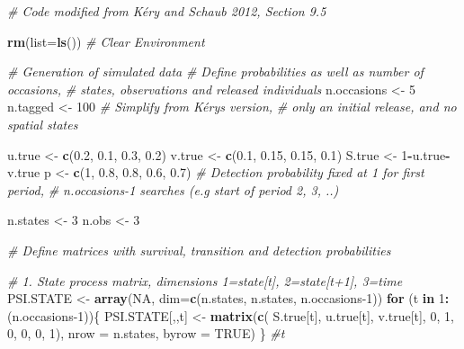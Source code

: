 \documentclass[
]{krantz}
\makeatletter
\newenvironment{Shaded}{\begin{snugshade}}{\end{snugshade}}
\newcommand{\AttributeTok}[1]{\textcolor[rgb]{0.27,0.27,0.27}{#1}}
\newcommand{\CommentTok}[1]{\textcolor[rgb]{0.37,0.37,0.37}{\textit{#1}}}
\newcommand{\ConstantTok}[1]{\textcolor[rgb]{0.37,0.37,0.37}{#1}}
\newcommand{\ControlFlowTok}[1]{\textcolor[rgb]{0.27,0.27,0.27}{\textbf{#1}}}
\newcommand{\DecValTok}[1]{\textcolor[rgb]{0.06,0.06,0.06}{#1}}
\newcommand{\FloatTok}[1]{\textcolor[rgb]{0.06,0.06,0.06}{#1}}
\newcommand{\FunctionTok}[1]{\textcolor[rgb]{0.27,0.27,0.27}{\textbf{#1}}}
\newcommand{\NormalTok}[1]{#1}
\newcommand{\OtherTok}[1]{\textcolor[rgb]{0.37,0.37,0.37}{#1}}
\newcommand{\SpecialCharTok}[1]{\textcolor[rgb]{0.43,0.43,0.43}{\textbf{#1}}}
\newenvironment{kframe}{%
\medskip{}
\setlength{\fboxsep}{.8em}
 \def\at@end@of@kframe{}%
 \ifinner\ifhmode%
  \def\at@end@of@kframe{\end{minipage}}%
  \begin{minipage}{\columnwidth}%
 \fi\fi%
 \def\FrameCommand##1{\hskip\@totalleftmargin \hskip-\fboxsep
 \colorbox{shadecolor}{##1}\hskip-\fboxsep
     \hskip-\linewidth \hskip-\@totalleftmargin \hskip\columnwidth}%
 \MakeFramed {\advance\hsize-\width
   \@totalleftmargin\z@ \linewidth\hsize
   \@setminipage}}%
 {\par\unskip\endMakeFramed%
 \at@end@of@kframe}
\renewenvironment{Shaded}{\begin{kframe}}{\end{kframe}}
\makeatother
\begin{document}
\begin{Shaded}
\begin{Highlighting}[]
\CommentTok{\# Code modified from Kéry and Schaub 2012, Section 9.5}

\FunctionTok{rm}\NormalTok{(}\AttributeTok{list=}\FunctionTok{ls}\NormalTok{()) }\CommentTok{\# Clear Environment}

\CommentTok{\# Generation of simulated data}
\CommentTok{\# Define probabilities as well as number of occasions, }
\CommentTok{\# states, observations and released individuals}
\NormalTok{n.occasions }\OtherTok{\textless{}{-}} \DecValTok{5}
\NormalTok{n.tagged }\OtherTok{\textless{}{-}} \DecValTok{100}  \CommentTok{\# Simplify from Kéry\textquotesingle{}s version, }
                 \CommentTok{\# only an initial release, and no spatial states}

\NormalTok{u.true }\OtherTok{\textless{}{-}} \FunctionTok{c}\NormalTok{(}\FloatTok{0.2}\NormalTok{, }\FloatTok{0.1}\NormalTok{, }\FloatTok{0.3}\NormalTok{, }\FloatTok{0.2}\NormalTok{)}
\NormalTok{v.true }\OtherTok{\textless{}{-}} \FunctionTok{c}\NormalTok{(}\FloatTok{0.1}\NormalTok{, }\FloatTok{0.15}\NormalTok{, }\FloatTok{0.15}\NormalTok{, }\FloatTok{0.1}\NormalTok{)}
\NormalTok{S.true }\OtherTok{\textless{}{-}} \DecValTok{1}\SpecialCharTok{{-}}\NormalTok{u.true}\SpecialCharTok{{-}}\NormalTok{v.true}
\NormalTok{p }\OtherTok{\textless{}{-}} \FunctionTok{c}\NormalTok{(}\DecValTok{1}\NormalTok{, }\FloatTok{0.8}\NormalTok{, }\FloatTok{0.8}\NormalTok{, }\FloatTok{0.6}\NormalTok{, }\FloatTok{0.7}\NormalTok{)}
\CommentTok{\#  Detection probability fixed at 1 for first period, }
\CommentTok{\# n.occasions{-}1 searches (e.g start of period 2, 3, ..)}

\NormalTok{n.states }\OtherTok{\textless{}{-}} \DecValTok{3}
\NormalTok{n.obs }\OtherTok{\textless{}{-}} \DecValTok{3}

\CommentTok{\# Define matrices with survival, transition and detection probabilities}

\CommentTok{\# 1. State process matrix, dimensions 1=state[t], 2=state[t+1], 3=time}
\NormalTok{PSI.STATE }\OtherTok{\textless{}{-}} \FunctionTok{array}\NormalTok{(}\ConstantTok{NA}\NormalTok{, }\AttributeTok{dim=}\FunctionTok{c}\NormalTok{(n.states, n.states, n.occasions}\DecValTok{{-}1}\NormalTok{))}
   \ControlFlowTok{for}\NormalTok{ (t }\ControlFlowTok{in} \DecValTok{1}\SpecialCharTok{:}\NormalTok{(n.occasions}\DecValTok{{-}1}\NormalTok{))\{}
\NormalTok{      PSI.STATE[,,t] }\OtherTok{\textless{}{-}} \FunctionTok{matrix}\NormalTok{(}\FunctionTok{c}\NormalTok{(}
\NormalTok{      S.true[t], u.true[t], v.true[t],}
      \DecValTok{0}\NormalTok{, }\DecValTok{1}\NormalTok{, }\DecValTok{0}\NormalTok{,}
      \DecValTok{0}\NormalTok{, }\DecValTok{0}\NormalTok{, }\DecValTok{1}\NormalTok{), }\AttributeTok{nrow =}\NormalTok{ n.states, }\AttributeTok{byrow =} \ConstantTok{TRUE}\NormalTok{)}
\NormalTok{      \} }\CommentTok{\#t}


\end{Highlighting}
\end{Shaded}
\end{document}
